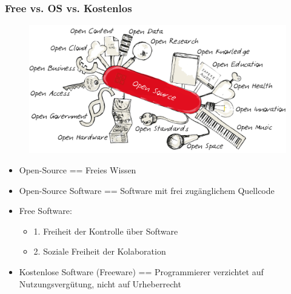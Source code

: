 \begin{frame}
\frametitle{Free vs. OS vs. Kostenlos}
\begin{figure}
\includegraphics[scale=0.5]{resources/open_swiss_knife.png}
\end{figure}
\begin{itemize}
	\item Open-Source == Freies Wissen
	\item Open-Source Software == Software mit frei zugänglichem Quellcode
	\item Free Software:
	\begin{itemize}
		\item 1. Freiheit der Kontrolle über Software
		\item 2. Soziale Freiheit der Kolaboration
	\end{itemize}
	\item Kostenlose Software (Freeware) == Programmierer verzichtet auf Nutzungsvergütung, nicht auf Urheberrecht
\end{itemize}

\end{frame}

